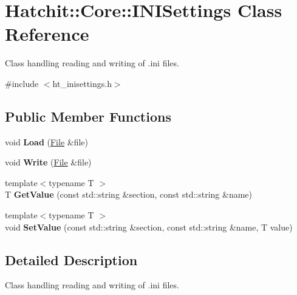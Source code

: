 \hypertarget{classHatchit_1_1Core_1_1INISettings}{}\section{Hatchit\+:\+:Core\+:\+:I\+N\+I\+Settings Class Reference}
\label{classHatchit_1_1Core_1_1INISettings}


Class handling reading and writing of .ini files.  




{\ttfamily \#include $<$ht\+\_\+inisettings.\+h$>$}

\subsection*{Public Member Functions}
\begin{DoxyCompactItemize}
\item 
void {\bfseries Load} (\hyperlink{classHatchit_1_1Core_1_1File}{File} \&file)\hypertarget{classHatchit_1_1Core_1_1INISettings_a8884aa363f6b2919faa681bcb05d0495}{}\label{classHatchit_1_1Core_1_1INISettings_a8884aa363f6b2919faa681bcb05d0495}

\item 
void {\bfseries Write} (\hyperlink{classHatchit_1_1Core_1_1File}{File} \&file)\hypertarget{classHatchit_1_1Core_1_1INISettings_a2d45a3863e18642c10f2bcf7befd3864}{}\label{classHatchit_1_1Core_1_1INISettings_a2d45a3863e18642c10f2bcf7befd3864}

\item 
{\footnotesize template$<$typename T $>$ }\\T {\bfseries Get\+Value} (const std\+::string \&section, const std\+::string \&name)\hypertarget{classHatchit_1_1Core_1_1INISettings_a06689968496fe4210b8410ba1d78e4cc}{}\label{classHatchit_1_1Core_1_1INISettings_a06689968496fe4210b8410ba1d78e4cc}

\item 
{\footnotesize template$<$typename T $>$ }\\void {\bfseries Set\+Value} (const std\+::string \&section, const std\+::string \&name, T value)\hypertarget{classHatchit_1_1Core_1_1INISettings_a62206a2d505564553f8c8d5a1473d00d}{}\label{classHatchit_1_1Core_1_1INISettings_a62206a2d505564553f8c8d5a1473d00d}

\end{DoxyCompactItemize}


\subsection{Detailed Description}
Class handling reading and writing of .ini files. 

